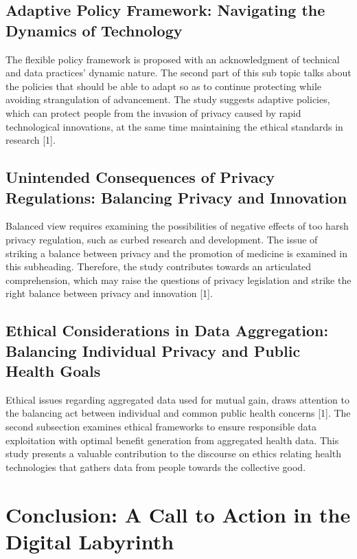 \documentclass[11pt]{article}
\begin{document}
\subsection{Adaptive Policy Framework: Navigating the Dynamics of Technology}

The flexible policy framework is proposed with an acknowledgment of technical and data practices’ dynamic nature. The second part of this sub topic talks about the policies that should be able to adapt so as to continue protecting while avoiding strangulation of advancement. The study suggests adaptive policies, which can protect people from the invasion of privacy caused by rapid technological innovations, at the same time maintaining the ethical standards in research [1].

\subsection{Unintended Consequences of Privacy Regulations: Balancing Privacy and Innovation}

Balanced view requires examining the possibilities of negative effects of too harsh privacy regulation, such as curbed research and development. The issue of striking a balance between privacy and the promotion of medicine is examined in this subheading. Therefore, the study contributes towards an articulated comprehension, which may raise the questions of privacy legislation and strike the right balance between privacy and innovation [1].

\subsection{Ethical Considerations in Data Aggregation: Balancing Individual Privacy and Public Health Goals}

Ethical issues regarding aggregated data used for mutual gain, draws attention to the balancing act between individual and common public health concerns [1]. The second subsection examines ethical frameworks to ensure responsible data exploitation with optimal benefit generation from aggregated health data. This study presents a valuable contribution to the discourse on ethics relating health technologies that gathers data from people towards the collective good.

\section{Conclusion: A Call to Action in the Digital Labyrinth}
\end{document}
